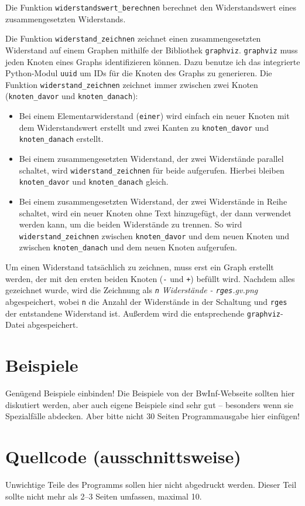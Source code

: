 \documentclass[a4paper,10pt,ngerman]{scrartcl}
\begin{document}
Die Funktion \texttt{widerstandswert\_berechnen} berechnet den Widerstandswert eines zusammengesetzten Widerstands.

Die Funktion \texttt{widerstand\_zeichnen} zeichnet einen zusammengesetzten Widerstand auf einem Graphen mithilfe der Bibliothek \texttt{graphviz}. \texttt{graphviz} muss jeden Knoten eines Graphs identifizieren können. Dazu benutze ich das integrierte Python-Modul \texttt{uuid} um IDs für die Knoten des Graphs zu generieren. Die Funktion \texttt{widerstand\_zeichnen} zeichnet immer zwischen zwei Knoten (\texttt{knoten\_davor} und \texttt{knoten\_danach}):
\begin{itemize}
  \item Bei einem Elementarwiderstand (\texttt{einer}) wird einfach ein neuer Knoten mit dem Widerstandswert erstellt und zwei Kanten zu \texttt{knoten\_davor} und \texttt{knoten\_danach} erstellt.
  \item Bei einem zusammengesetzten Widerstand, der zwei Widerstände parallel schaltet, wird \texttt{widerstand\_zeichnen} für beide aufgerufen. Hierbei bleiben \texttt{knoten\_davor} und \texttt{knoten\_danach} gleich.
  \item Bei einem zusammengesetzten Widerstand, der zwei Widerstände in Reihe schaltet, wird ein neuer Knoten ohne Text hinzugefügt, der dann verwendet werden kann, um die beiden Widerstände zu trennen. So wird \texttt{widerstand\_zeichnen} zwischen \texttt{knoten\_davor} und dem neuen Knoten und zwischen \texttt{knoten\_danach} und dem neuen Knoten aufgerufen.
\end{itemize}
Um einen Widerstand tatsächlich zu zeichnen, muss erst ein Graph erstellt werden, der mit den ersten beiden Knoten (\texttt{-} und \texttt{+}) befüllt wird. Nachdem alles gezeichnet wurde, wird die Zeichnung als \textit{\texttt{n} Widerstände - \texttt{rges}.gv.png} abgespeichert, wobei \texttt{n} die Anzahl der Widerstände in der Schaltung und \texttt{rges} der entstandene Widerstand ist. Außerdem wird die entsprechende \texttt{graphviz}-Datei abgespeichert.

\section{Beispiele}
Genügend Beispiele einbinden! Die Beispiele von der BwInf-Webseite sollten hier diskutiert werden, aber auch eigene Beispiele sind sehr gut – besonders wenn sie Spezialfälle abdecken. Aber bitte nicht 30 Seiten Programmausgabe hier einfügen!

\section{Quellcode (ausschnittsweise)}
Unwichtige Teile des Programms sollen hier nicht abgedruckt werden. Dieser Teil sollte nicht mehr als 2–3 Seiten umfassen, maximal 10.
\end{document}
